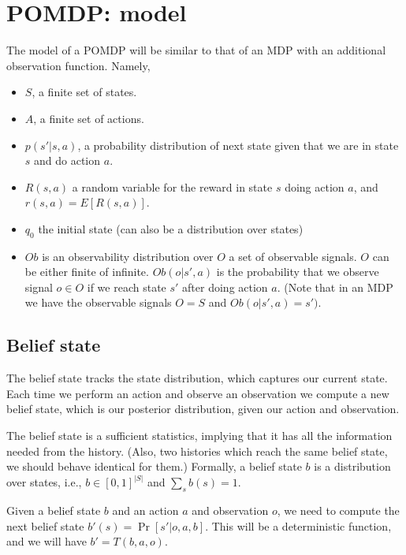 \section{POMDP: model}

The model of a POMDP will be similar to that of an MDP with an
additional observation function. Namely,
\begin{itemize}
\item
$S$, a finite set of states.
\item
$A$, a finite set of actions.
\item
$p(s'|s,a)$, a probability distribution of next state given that we
are in state $s$ and do action $a$.
\item
$R(s,a)$ a random variable for the reward in state $s$ doing action
$a$, and $r(s,a)=E[R(s,a)]$.
\item
$q_0$ the initial state (can also be a distribution over states)
\item
$Ob$ is an observability distribution over $O$ a set of observable
signals. $O$ can be either finite of infinite. $Ob(o|s',a)$ is the
probability that we observe signal $o\in O$ if we reach state $s'$
after doing action $a$. (Note that in an MDP we have the observable
signals $O=S$ and $Ob(o|s',a)=s')$.
\end{itemize}

\subsection{Belief state}

The belief state tracks the state distribution, which captures our
current state. Each time we perform an action and observe an
observation we compute a new belief state, which is our posterior
distribution, given our action and observation.

The belief state is a sufficient statistics, implying that it has
all the information needed from the history. (Also, two histories
which reach the same belief state, we should behave identical for
them.)
%
Formally, a belief state $b$ is a distribution over states, i.e.,
$b\in[0,1]^{|S|}$ and $\sum_s b(s)=1$.

Given a belief state $b$ and an action $a$ and observation $o$, we
need to compute the next belief state $b'(s)=\Pr[s'|o,a,b]$. This
will be a deterministic function, and we will have $b'=T(b,a,o)$.

